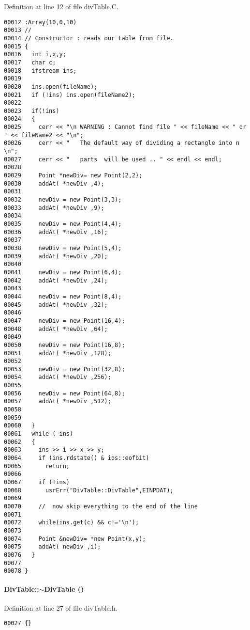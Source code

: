 Definition at line 12 of file div\-Table.C.\small\begin{verbatim}00012 :Array(10,0,10)
00013 //
00014 // Constructor : reads our table from file.
00015 {
00016   int i,x,y;
00017   char c;
00018   ifstream ins;
00019 
00020   ins.open(fileName);
00021   if (!ins) ins.open(fileName2);
00022 
00023   if(!ins)
00024   {
00025     cerr << "\n WARNING : Cannot find file " << fileName << " or " << fileName2 << "\n";
00026     cerr << "   The default way of dividing a rectangle into n \n";
00027     cerr << "   parts  will be used .. " << endl << endl;
00028     
00029     Point *newDiv= new Point(2,2);
00030     addAt( *newDiv ,4);
00031 
00032     newDiv = new Point(3,3);
00033     addAt( *newDiv ,9);
00034 
00035     newDiv = new Point(4,4);
00036     addAt( *newDiv ,16);
00037 
00038     newDiv = new Point(5,4);
00039     addAt( *newDiv ,20);
00040 
00041     newDiv = new Point(6,4);
00042     addAt( *newDiv ,24);
00043 
00044     newDiv = new Point(8,4);
00045     addAt( *newDiv ,32);
00046 
00047     newDiv = new Point(16,4);
00048     addAt( *newDiv ,64);
00049 
00050     newDiv = new Point(16,8);
00051     addAt( *newDiv ,128);
00052 
00053     newDiv = new Point(32,8);
00054     addAt( *newDiv ,256);
00055 
00056     newDiv = new Point(64,8);
00057     addAt( *newDiv ,512);
00058 
00059 
00060   }
00061   while ( ins) 
00062   {
00063     ins >> i >> x >> y;
00064     if (ins.rdstate() & ios::eofbit)
00065       return;
00066 
00067     if (!ins)
00068       usrErr("DivTable::DivTable",EINPDAT);
00069     
00070     //  now skip everything to the end of the line
00071 
00072     while(ins.get(c) && c!='\n');
00073 
00074     Point &newDiv= *new Point(x,y);
00075     addAt( newDiv ,i);
00076   }
00077   
00078 }
\end{verbatim}\normalsize 
\label{DivTable_a1}
\paragraph{\setlength{\rightskip}{0pt plus 5cm}Div\-Table::$\sim$Div\-Table ()\hspace{0.3cm}{\tt  [inline]}}\hfill



Definition at line 27 of file div\-Table.h.\small\begin{verbatim}00027 {}
\end{verbatim}\normalsize 


